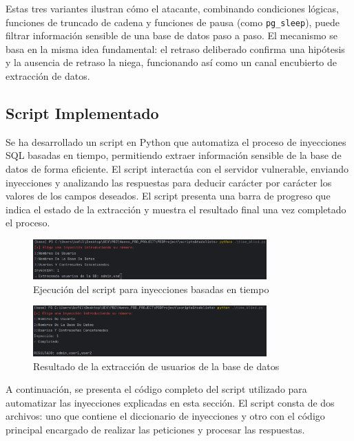 \documentclass[a4paper,12pt]{article}
\begin{document}
\medskip

Estas tres variantes ilustran cómo el atacante, combinando condiciones lógicas, funciones de truncado de cadena y funciones de pausa (como \texttt{pg\_sleep}), puede filtrar información sensible de una base de datos paso a paso. El mecanismo se basa en la misma idea fundamental: el retraso deliberado confirma una hipótesis y la ausencia de retraso la niega, funcionando así como un canal encubierto de extracción de datos.


\subsection{Script Implementado}

Se ha desarrollado un script en Python que automatiza el proceso de inyecciones SQL basadas en tiempo, permitiendo extraer información sensible de la base de datos de forma eficiente. El script interactúa con el servidor vulnerable, enviando inyecciones y analizando las respuestas para deducir carácter por carácter los valores de los campos deseados.  
El script presenta una barra de progreso que indica el estado de la extracción y muestra el resultado final una vez completado el proceso.

\begin{figure}[H]
    \centering
    \includegraphics[width=0.8\textwidth]{Imagenes/Time_Blind_Script.png}
    \caption{Ejecución del script para inyecciones basadas en tiempo}
\end{figure}

\begin{figure}[H]
    \centering
    \includegraphics[width=0.8\textwidth]{Imagenes/Time_Blind_Script2.png}
    \caption{Resultado de la extracción de usuarios de la base de datos}
\end{figure}

A continuación, se presenta el código completo del script utilizado para automatizar las inyecciones explicadas en esta sección. El script consta de dos archivos: uno que contiene el diccionario de inyecciones y otro con el código principal encargado de realizar las peticiones y procesar las respuestas.
\end{document}
